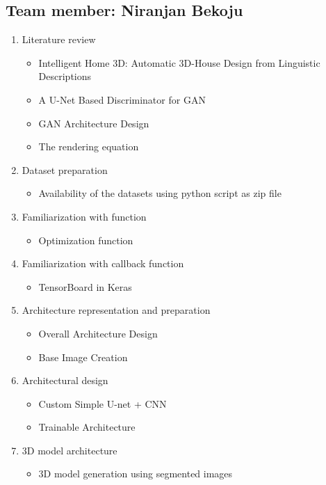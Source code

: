 \subsection{Team member: Niranjan Bekoju}
\begin{enumerate}[label=\alph*.]
    \item Literature review
\begin{itemize}
    \item Intelligent Home 3D: Automatic 3D-House Design from Linguistic Descriptions
    \item A U-Net Based Discriminator for GAN
    \item GAN Architecture Design
    \item The rendering equation
\end{itemize}
    \item Dataset preparation
\begin{itemize}
    \item Availability of the datasets using python script as zip file
\end{itemize}
\item{Familiarization with function}
\begin{itemize}
    \item Optimization function
\end{itemize}
\item{Familiarization with callback function}
\begin{itemize}
    \item TensorBoard in Keras
\end{itemize}
\item Architecture representation and preparation
\begin{itemize}
    \item Overall Architecture Design
    \item Base Image Creation
\end{itemize}
\item Architectural design
\begin{itemize}
    \item Custom Simple U-net + CNN
    \item Trainable Architecture
\end{itemize}
\item 3D model architecture
\begin{itemize}
    \item 3D model generation using segmented images
\end{itemize}
\end{enumerate}
